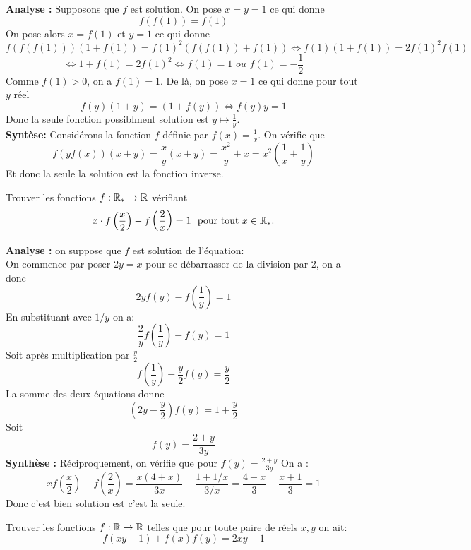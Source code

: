 \begin{preuve}
\textbf{Analyse :} Supposons que $f$ est solution. On pose $x=y=1$ ce qui donne 
$$f(f(1))=f(1) $$
On pose alors $x=f(1)$ et $y=1$ ce qui donne 
$$f(f(f(1)))(1+f(1))=f(1)^2(f(f(1))+f(1))\iff f(1)(1+f(1))=2f(1)^2f(1)$$ $$\iff 1+f(1)=2f(1)^2\iff f(1)=1 \textit{ ou } f(1)=-\frac{1}{2} $$
Comme $f(1)>0$, on a $f(1)=1$. De là, on pose $x=1$ ce qui donne pour tout $y$ réel
$$f(y)(1+y)=(1+f(y))\iff f(y)y=1 $$
Donc la seule fonction possiblment solution est $y\mapsto \frac{1}{y}$.
\\
\textbf{Syntèse:}
Considérons la fonction $f$ définie par $f(x)=\frac{1}{x}$. On vérifie que $$f(yf(x))(x+y)=\frac{x}{y}(x+y)=\frac{x^2}{y}+x=x^2\left(\frac{1}{x}+ \frac{1}{y}\right) $$
Et donc la seule la solution est la fonction inverse.
\end{preuve}
\begin{exo}[M]
Trouver les fonctions $f:\mathbb R_*\to \mathbb R$ vérifiant
$$x \cdot f\left(\frac{x}{2}\right) - f\left(\frac{2}{x}\right) = 1 \ \text{ pour tout } x \in \mathbb R_*. $$
\end{exo}
\begin{preuve}
\textbf{Analyse :} on suppose que $f$ est solution de l'équation:
\\

On commence par poser $2y=x$ pour se débarrasser de la division par 2, on a donc
$$2yf(y)-f\left(\frac{1}{y}\right)=1$$
En substituant avec $1/y$ on a:
$$\frac{2}{y}f\left(\frac{1}{y}\right)-f(y)=1$$
Soit après multiplication par $\frac{y}{2}$
$$f\left(\frac{1}{y}\right)-\frac{y}{2}f(y)=\frac{y}{2}$$
La somme des deux équations donne
$$\left(2y-\frac{y}{2}\right)f(y)=1+\frac{y}{2}$$
Soit $$f(y)=\frac{2+y}{3y}$$
\textbf{Synthèse :}
Réciproquement, on vérifie que
pour $f(y)=\frac{2+y}{3y}$
On a :
$$xf\left(\frac{x}{2}\right)-f\left(\frac{2}{x}\right)=\frac{x(4+x)}{3x}-\frac{1+1/x}{3/x}=\frac{4+x}{3}-\frac{x+1}{3}=1$$
Donc c'est bien solution est c'est la seule. 
\end{preuve}

\begin{exo}[D]
Trouver les fonctions $f:\mathbb R\to \mathbb R$ telles que pour toute paire de réels $x,y$ on ait:
$$f(xy-1)+f(x)f(y)=2xy-1 $$
\end{exo}

